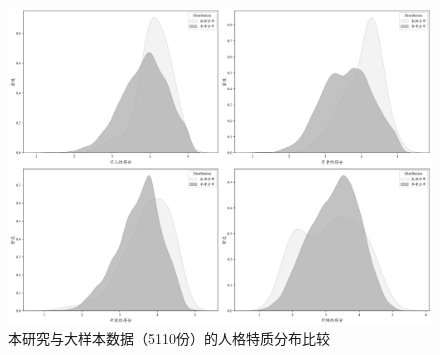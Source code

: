 \begin{figure}[H]
    \centering
    \includegraphics[width=1.0\linewidth]{Image/Study1-exp4-distribution.png}
    \caption{\label{fig:Study1-exp4-distribution}本研究与大样本数据（5110份）的人格特质分布比较}
\end{figure}

